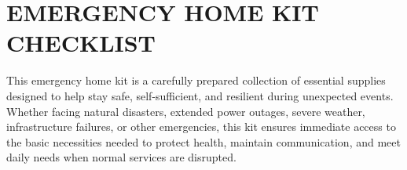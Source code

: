 
\section*{\centering EMERGENCY HOME KIT CHECKLIST}
\vspace*{0.5cm}

This emergency home kit is a carefully prepared collection of essential supplies designed to help stay safe, self-sufficient, and resilient during unexpected events. Whether facing natural disasters, extended power outages, severe weather, infrastructure failures, or other emergencies, this kit ensures immediate access to the basic necessities needed to protect health, maintain communication, and meet daily needs when normal services are disrupted.

